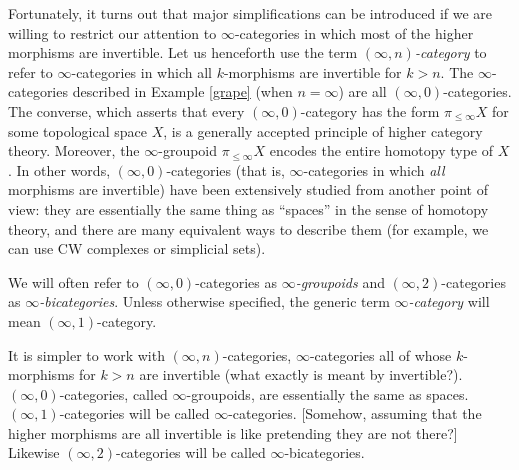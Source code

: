 Fortunately, it turns out that major simplifications can be
introduced if we are willing to restrict our attention to
$\infty$-categories in which most of the higher morphisms are
invertible. Let us henceforth use the term {\it $(\infty,n)$-category}
to refer to $\infty$-categories in which all $k$-morphisms are
invertible for $k > n$. The $\infty$-categories described in
Example \ref{grape} (when $n=\infty$) are all
$(\infty,0)$-categories. The converse, which asserts that every
$(\infty,0)$-category has the form $\pi_{\leq \infty} X$ for some
topological space $X$, is a generally accepted principle of higher
category theory. Moreover, the $\infty$-groupoid $\pi_{\leq \infty} X$ encodes the entire homotopy type of $X$. In other words, $(\infty,0)$-categories (that is,
$\infty$-categories in which {\em all} morphisms are invertible)
have been extensively studied from another point of view: they are
essentially the same thing as ``spaces'' in the sense of homotopy
theory, and there are many equivalent ways to describe them (for
example, we can use CW complexes or simplicial sets).

\begin{convention}
We will often refer to $(\infty,0)$-categories as {\it $\infty$-groupoids} and $(\infty,2)$-categories as {\it $\infty$-bicategories}. Unless otherwise specified, the generic term {\it $\infty$-category} will mean $(\infty,1)$-category. 
\end{convention}
\begin{shaded}
It is simpler to work with $(\infty,n)$-categories, $\infty$-categories all of whose $k$-morphisms for $k>n$ are invertible (what exactly is meant by invertible?). $(\infty,0)$-categories, called $\infty$-groupoids, are essentially the same as spaces. $(\infty,1)$-categories will be called $\infty$-categories. [Somehow, assuming that the higher morphisms are all invertible is like pretending they are not there?] Likewise $(\infty,2)$-categories will be called $\infty$-bicategories.
\end{shaded}

